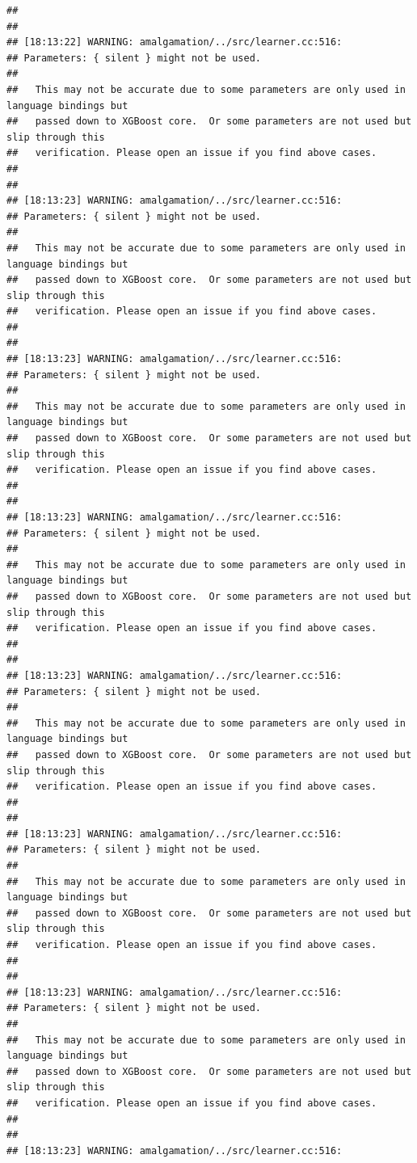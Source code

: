 \documentclass[AMS,STIX2COL]{WileyNJD-v2}\usepackage[]{graphicx}\usepackage[]{color}
\makeatletter
\newenvironment{kframe}{%
 \def\at@end@of@kframe{}%
 \ifinner\ifhmode%
  \def\at@end@of@kframe{\end{minipage}}%
  \begin{minipage}{\columnwidth}%
 \fi\fi%
 \def\FrameCommand##1{\hskip\@totalleftmargin \hskip-\fboxsep
 \colorbox{shadecolor}{##1}\hskip-\fboxsep
     \hskip-\linewidth \hskip-\@totalleftmargin \hskip\columnwidth}%
 \MakeFramed {\advance\hsize-\width
   \@totalleftmargin\z@ \linewidth\hsize
   \@setminipage}}%
 {\par\unskip\endMakeFramed%
 \at@end@of@kframe}
\newenvironment{knitrout}{}{} %
\makeatother
\begin{document}
\begin{knitrout}
\begin{kframe}
\begin{verbatim}
## 
## 
## [18:13:22] WARNING: amalgamation/../src/learner.cc:516: 
## Parameters: { silent } might not be used.
## 
##   This may not be accurate due to some parameters are only used in language bindings but
##   passed down to XGBoost core.  Or some parameters are not used but slip through this
##   verification. Please open an issue if you find above cases.
## 
## 
## [18:13:23] WARNING: amalgamation/../src/learner.cc:516: 
## Parameters: { silent } might not be used.
## 
##   This may not be accurate due to some parameters are only used in language bindings but
##   passed down to XGBoost core.  Or some parameters are not used but slip through this
##   verification. Please open an issue if you find above cases.
## 
## 
## [18:13:23] WARNING: amalgamation/../src/learner.cc:516: 
## Parameters: { silent } might not be used.
## 
##   This may not be accurate due to some parameters are only used in language bindings but
##   passed down to XGBoost core.  Or some parameters are not used but slip through this
##   verification. Please open an issue if you find above cases.
## 
## 
## [18:13:23] WARNING: amalgamation/../src/learner.cc:516: 
## Parameters: { silent } might not be used.
## 
##   This may not be accurate due to some parameters are only used in language bindings but
##   passed down to XGBoost core.  Or some parameters are not used but slip through this
##   verification. Please open an issue if you find above cases.
## 
## 
## [18:13:23] WARNING: amalgamation/../src/learner.cc:516: 
## Parameters: { silent } might not be used.
## 
##   This may not be accurate due to some parameters are only used in language bindings but
##   passed down to XGBoost core.  Or some parameters are not used but slip through this
##   verification. Please open an issue if you find above cases.
## 
## 
## [18:13:23] WARNING: amalgamation/../src/learner.cc:516: 
## Parameters: { silent } might not be used.
## 
##   This may not be accurate due to some parameters are only used in language bindings but
##   passed down to XGBoost core.  Or some parameters are not used but slip through this
##   verification. Please open an issue if you find above cases.
## 
## 
## [18:13:23] WARNING: amalgamation/../src/learner.cc:516: 
## Parameters: { silent } might not be used.
## 
##   This may not be accurate due to some parameters are only used in language bindings but
##   passed down to XGBoost core.  Or some parameters are not used but slip through this
##   verification. Please open an issue if you find above cases.
## 
## 
## [18:13:23] WARNING: amalgamation/../src/learner.cc:516: 

\end{verbatim}
\end{kframe}
\end{knitrout}
\end{document}
